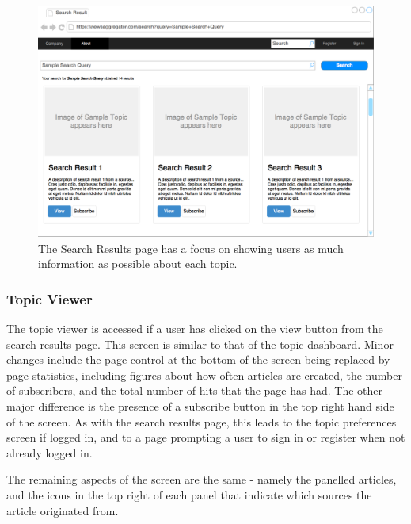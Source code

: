 \documentclass[12pt]{article}
\begin{document}
\begin{figure}[ht!]
  \centering
    \includegraphics[scale=0.3]{SearchPage.png}
   \caption[A wireframe of the Search Results page]{The Search Results page has a focus on showing users as much information as possible about each topic.}
   \label{searchPage}
\end{figure}

\subsubsection{Topic Viewer}

The topic viewer is accessed if a user has clicked on the view button from the search results page. This screen is similar to that of the topic dashboard. Minor changes include the page control at the bottom of the screen being replaced by page statistics, including figures about how often articles are created, the number of subscribers, and the total number of hits that the page has had. The other major difference is the presence of a subscribe button in the top right hand side of the screen. As with the search results page, this leads to the topic preferences screen if logged in, and to a page prompting a user to sign in or register when not already logged in.

The remaining aspects of the screen are the same - namely the panelled articles, and the icons in the top right of each panel that indicate which sources the article originated from.
\end{document}
